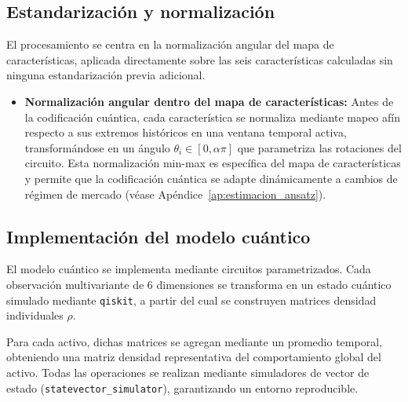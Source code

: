 \subsection{Estandarización y normalización}
\label{sec:estandarizacion_control}

El procesamiento se centra en la normalización angular del mapa de características, aplicada directamente sobre las seis características calculadas sin ninguna estandarización previa adicional.

\begin{itemize}
\item \textbf{Normalización angular dentro del mapa de características:} Antes de la codificación cuántica, cada característica se normaliza mediante mapeo afín respecto a sus extremos históricos en una ventana temporal activa, transformándose en un ángulo $\theta_i \in [0, \alpha\pi]$ que parametriza las rotaciones del circuito. Esta normalización min-max es específica del mapa de características y permite que la codificación cuántica se adapte dinámicamente a cambios de régimen de mercado (véase Apéndice~\ref{ap:estimacion_ansatz}).
\end{itemize}

\subsection{Implementación del modelo cuántico}
\label{sec:implementacion_modelo_cuantico}

El modelo cuántico se implementa mediante circuitos parametrizados. Cada observación multivariante de 6 dimensiones se transforma en un estado cuántico simulado mediante \texttt{qiskit}, a partir del cual se construyen matrices densidad individuales $\rho$.

Para cada activo, dichas matrices se agregan mediante un promedio temporal, obteniendo una matriz densidad representativa del comportamiento global del activo. Todas las operaciones se realizan mediante simuladores de vector de estado (\texttt{statevector\_simulator}), garantizando un entorno reproducible.
